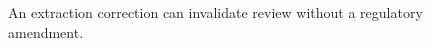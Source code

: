 \begin{figure}[H]
\centering
{}
\caption{An extraction correction can invalidate review without a regulatory amendment.}\label{fig:teach-M08-05}
\end{figure}
